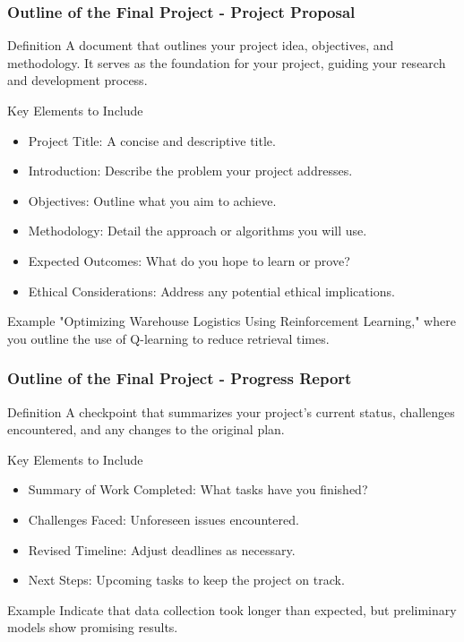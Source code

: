 \documentclass[aspectratio=169]{beamer}
\begin{document}
\begin{frame}[fragile]
  \frametitle{Outline of the Final Project - Project Proposal}
  \begin{block}{Definition}
    A document that outlines your project idea, objectives, and methodology. It serves as the foundation for your project, guiding your research and development process.
  \end{block}

  \begin{block}{Key Elements to Include}
    \begin{itemize}
      \item Project Title: A concise and descriptive title.
      \item Introduction: Describe the problem your project addresses.
      \item Objectives: Outline what you aim to achieve.
      \item Methodology: Detail the approach or algorithms you will use.
      \item Expected Outcomes: What do you hope to learn or prove?
      \item Ethical Considerations: Address any potential ethical implications.
    \end{itemize}
  \end{block}

  \begin{block}{Example}
    "Optimizing Warehouse Logistics Using Reinforcement Learning," where you outline the use of Q-learning to reduce retrieval times.
  \end{block}
\end{frame}

\begin{frame}[fragile]
  \frametitle{Outline of the Final Project - Progress Report}
  \begin{block}{Definition}
    A checkpoint that summarizes your project's current status, challenges encountered, and any changes to the original plan.
  \end{block}

  \begin{block}{Key Elements to Include}
    \begin{itemize}
      \item Summary of Work Completed: What tasks have you finished?
      \item Challenges Faced: Unforeseen issues encountered.
      \item Revised Timeline: Adjust deadlines as necessary.
      \item Next Steps: Upcoming tasks to keep the project on track.
    \end{itemize}
  \end{block}
  
  \begin{block}{Example}
    Indicate that data collection took longer than expected, but preliminary models show promising results.
  \end{block}
\end{frame}
\end{document}
